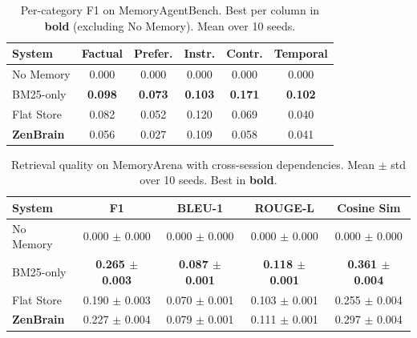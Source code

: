 \documentclass{article}
\begin{document}
\begin{table}[h]
    \caption{Per-category F1 on MemoryAgentBench.
    Best per column in \textbf{bold} (excluding No Memory). Mean over 10 seeds.}
    \label{tab:mab-categories}
    \centering
    \small
    \begin{tabular}{lccccc}
        \toprule
        System & Factual & Prefer. & Instr. & Contr. & Temporal \\
        \midrule
        No Memory & 0.000 & 0.000 & 0.000 & 0.000 & 0.000 \\
        BM25-only & \textbf{0.098} & \textbf{0.073} & \textbf{0.103} & \textbf{0.171} & \textbf{0.102} \\
        Flat Store & 0.082 & 0.052 & 0.120 & 0.069 & 0.040 \\
        \textbf{ZenBrain} & 0.056 & 0.027 & 0.109 & 0.058 & 0.041 \\
        \bottomrule
    \end{tabular}
\end{table}

\begin{table}[h]
    \caption{Retrieval quality on MemoryArena
    \citep{he2026memoryarena} with cross-session dependencies.
    Mean $\pm$ std over 10 seeds. Best in \textbf{bold}.}
    \label{tab:memoryarena}
    \centering
    \begin{tabular}{lcccc}
        \toprule
        System & F1 & BLEU-1 & ROUGE-L & Cosine Sim \\
        \midrule
        No Memory & 0.000 $\pm$ 0.000 & 0.000 $\pm$ 0.000 & 0.000 $\pm$ 0.000 & 0.000 $\pm$ 0.000 \\
        BM25-only & \textbf{0.265 $\pm$ 0.003} & \textbf{0.087 $\pm$ 0.001} & \textbf{0.118 $\pm$ 0.001} & \textbf{0.361 $\pm$ 0.004} \\
        Flat Store & 0.190 $\pm$ 0.003 & 0.070 $\pm$ 0.001 & 0.103 $\pm$ 0.001 & 0.255 $\pm$ 0.004 \\
        \textbf{ZenBrain} & 0.227 $\pm$ 0.004 & 0.079 $\pm$ 0.001 & 0.111 $\pm$ 0.001 & 0.297 $\pm$ 0.004 \\
        \bottomrule
    \end{tabular}
\end{table}
\end{document}

